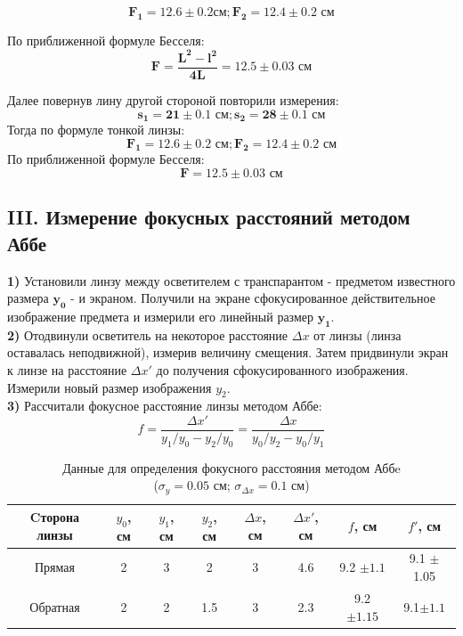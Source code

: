 $$\bm{F_1 = 12.6\pm 0.2 \textbf{см}; F_2 = 12.4\pm0.2 \textbf{ см}}$$

По приближенной формуле Бесселя:
\begin{equation}
    \bm{F = \frac{L^2 - l^2}{4L} = 12.5 \pm 0.03} \textbf{ см}
\end{equation}

Далее повернув лину другой стороной повторили измерения:
$$\bm{s_1 = 21 \pm 0.1 \textbf{ см}; s_2 = 28 \pm 0.1 \textbf{ см}} $$
Тогда по формуле тонкой линзы:
$$\bm{F_1 = 12.6 \pm 0.2 \textbf{ см}; F_2 = 12.4 \pm 0.2 \textbf{ см}} $$
По приближенной формуле Бесселя:
$$\bm{F = 12.5 \pm 0.03 \textbf{ см}}$$

\subsection*{III. Измерение фокусных расстояний методом Аббе}
\textbf{1)} Установили линзу между осветителем с транспарантом - предметом известного размера $\bm{y_0}$ - и экраном. Получили на экране сфокусированное действительное изображение предмета и измерили его линейный размер $\bm{y_1}$.\\ 

\textbf{2)} Отодвинули осветитель на некоторое расстояние ${\Delta x}$ от линзы (линза оставалась неподвижной), измерив величину смещения. Затем придвинули экран к линзе на расстояние ${\Delta x'}$ до получения сфокусированного изображения. Измерили новый размер изображения ${y_2}$. \\

\textbf{3)} Рассчитали фокусное расстояние линзы методом Аббе:
\begin{equation}
    f = \frac{\Delta x'}{y_1 / y_0 - y_2 / y_0} = \frac{\Delta x}{y_0 / y_2 - y_0 / y_1}
\end{equation}

\begin{table}[h!]
    \centering
    \begin{tabular}{|c|c|c|c|c|c|c|c|}
        \hline
        Cторона линзы & $y_0$, см & $y_1$, см & $y_2$, см & $\Delta x$, см & $\Delta x'$, см & $f$, см & $f'$, см \\\hline
        Прямая   & 2 & 3 & 2   & 3 & 4.6 & 9.2 $\pm 1.1$ & 9.1 $\pm$ 1.05\\\hline
        Обратная & 2 & 2 & 1.5 & 3 & 2.3 & 9.2 $\pm 1.15$ & 9.1$\pm 1.1$ \\\hline
    \end{tabular}
    \caption{Данные для определения фокусного расстояния методом Аббe\\($\sigma_y = 0.05$ см; $\sigma_{\Delta{x}} = 0.1$ см)}
\end{table}



